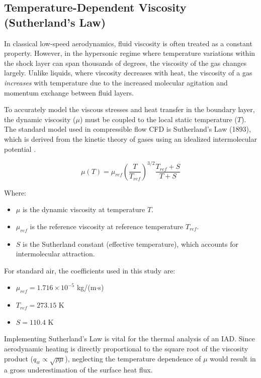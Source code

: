 \subsection{Temperature-Dependent Viscosity (Sutherland’s Law)}

In classical low-speed aerodynamics, fluid viscosity is often treated as a constant property. However, in the hypersonic regime where temperature variations within the shock layer can span thousands of degrees, the viscosity of the gas changes largely. Unlike liquids, where viscosity decreases with heat, the viscosity of a gas \textit{increases} with temperature due to the increased molecular agitation and momentum exchange between fluid layers.
\par
To accurately model the viscous stresses and heat transfer in the boundary layer, the dynamic viscosity ($\mu$) must be coupled to the local static temperature ($T$). The standard model used in compressible flow CFD is Sutherland’s Law (1893), which is derived from the kinetic theory of gases using an idealized intermolecular potential \cite{AndersonHypersonic}.

\begin{equation}
    \mu(T) = \mu_{ref} \left( \frac{T}{T_{ref}} \right)^{3/2} \frac{T_{ref} + S}{T + S}
    \label{eq:sutherland}
\end{equation}

Where:
\begin{itemize}
    \item $\mu$ is the dynamic viscosity at temperature $T$.
    \item $\mu_{ref}$ is the reference viscosity at reference temperature $T_{ref}$.
    \item $S$ is the Sutherland constant (effective temperature), which accounts for intermolecular attraction.
\end{itemize}

For standard air, the coefficients used in this study are:
\begin{itemize}
    \item $\mu_{ref} = 1.716 \times 10^{-5}$ kg/(m$\cdot$s)
    \item $T_{ref} = 273.15$ K
    \item $S = 110.4$ K
\end{itemize}

Implementing Sutherland's Law is vital for the thermal analysis of an IAD. Since aerodynamic heating is directly proportional to the square root of the viscosity product ($q_w \propto \sqrt{\rho \mu}$), neglecting the temperature dependence of $\mu$ would result in a gross underestimation of the surface heat flux.


